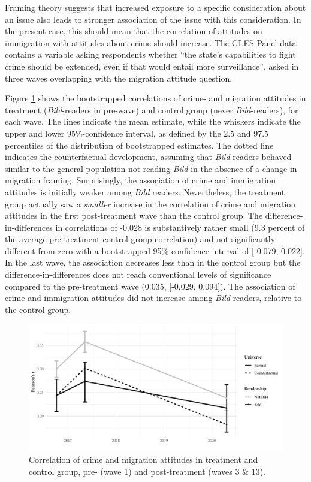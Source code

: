 \documentclass[
  12pt,
]{article}
\begin{document}
Framing theory suggests that increased exposure to a specific consideration about an issue also leads to stronger association of the issue with this consideration. In the present case, this should mean that the correlation of attitudes on immigration with attitudes about crime should increase. The GLES Panel data contains a variable asking respondents whether ``the state's capabilities to fight crime should be extended, even if that would entail more surveillance'', asked in three waves overlapping with the migration attitude question.

Figure \ref{fig:corplot} shows the bootstrapped correlations of crime- and migration attitudes in treatment (\emph{Bild}-readers in pre-wave) and control group (never \emph{Bild}-readers), for each wave. The lines indicate the mean estimate, while the whiskers indicate the upper and lower 95\%-confidence interval, as defined by the 2.5 and 97.5 percentiles of the distribution of bootstrapped estimates. The dotted line indicates the counterfactual development, assuming that \emph{Bild}-readers behaved similar to the general population not reading \emph{Bild} in the absence of a change in migration framing. Surprisingly, the association of crime and immigration attitudes is initially weaker among \emph{Bild} readers. Nevertheless, the treatment group actually saw a \emph{smaller} increase in the correlation of crime and migration attitudes in the first post-treatment wave than the control group. The difference-in-differences in correlations of -0.028 is substantively rather small (9.3 percent of the average pre-treatment control group correlation) and not significantly different from zero with a bootstrapped 95\% confidence interval of {[}-0.079, 0.022{]}. In the last wave, the association decreases less than in the control group but the difference-in-differences does not reach conventional levels of significance compared to the pre-treatment wave (0.035, {[}-0.029, 0.094{]}). The association of crime and immigration attitudes did not increase among \emph{Bild} readers, relative to the control group.

\begin{figure}[!ht]

{\centering \includegraphics{Manuscript_Framing_files/figure-latex/corplot-1} 

}

\caption{Correlation of crime and migration attitudes in treatment and control group, pre- (wave 1) and post-treatment (waves 3 \& 13).}\label{fig:corplot}
\end{figure}
\end{document}
